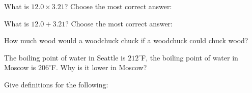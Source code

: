 \documentclass[11pt,addpoints]{exam}   	%
\begin{document}
\begin{questions}
\vspace{.2in}

\question[2]
What is $ 12.0 \times 3.21 $? Choose the most correct answer:

\begin{choices}
\end{choices}
\vspace{.2in}

\question[2]
What is $ 12.0 + 3.21 $? Choose the most correct answer:

\begin{choices}
\end{choices}
\vspace{.2in}

\question[1]
How much wood would a woodchuck chuck if a woodchuck could chuck wood?
\vspace{.2in}

\question[1]
The boiling point of water in Seattle is $212^{\circ}$F, the boiling point of water in Moscow is $206^{\circ}$F. Why is it lower in Moscow?
\vspace{.2in}

\question
Give definitions for the following:
\end{questions}
\end{document}

